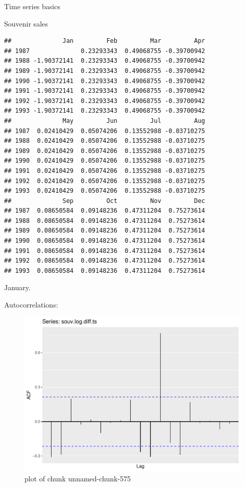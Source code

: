 \documentclass[ignorenonframetext,]{beamer}
\newenvironment{Shaded}{\begin{snugshade}}{\end{snugshade}}
\newcommand{\DataTypeTok}[1]{\textcolor[rgb]{0.13,0.29,0.53}{#1}}
\newcommand{\KeywordTok}[1]{\textcolor[rgb]{0.13,0.29,0.53}{\textbf{#1}}}
\newcommand{\NormalTok}[1]{#1}
\newcommand{\OperatorTok}[1]{\textcolor[rgb]{0.81,0.36,0.00}{\textbf{#1}}}
\newcommand{\StringTok}[1]{\textcolor[rgb]{0.31,0.60,0.02}{#1}}
\begin{document}
\begin{frame}[fragile]{Time series basics}
\begin{block}{Souvenir sales}
\begin{verbatim}
##              Jan         Feb         Mar         Apr
## 1987              0.23293343  0.49068755 -0.39700942
## 1988 -1.90372141  0.23293343  0.49068755 -0.39700942
## 1989 -1.90372141  0.23293343  0.49068755 -0.39700942
## 1990 -1.90372141  0.23293343  0.49068755 -0.39700942
## 1991 -1.90372141  0.23293343  0.49068755 -0.39700942
## 1992 -1.90372141  0.23293343  0.49068755 -0.39700942
## 1993 -1.90372141  0.23293343  0.49068755 -0.39700942
##              May         Jun         Jul         Aug
## 1987  0.02410429  0.05074206  0.13552988 -0.03710275
## 1988  0.02410429  0.05074206  0.13552988 -0.03710275
## 1989  0.02410429  0.05074206  0.13552988 -0.03710275
## 1990  0.02410429  0.05074206  0.13552988 -0.03710275
## 1991  0.02410429  0.05074206  0.13552988 -0.03710275
## 1992  0.02410429  0.05074206  0.13552988 -0.03710275
## 1993  0.02410429  0.05074206  0.13552988 -0.03710275
##              Sep         Oct         Nov         Dec
## 1987  0.08650584  0.09148236  0.47311204  0.75273614
## 1988  0.08650584  0.09148236  0.47311204  0.75273614
## 1989  0.08650584  0.09148236  0.47311204  0.75273614
## 1990  0.08650584  0.09148236  0.47311204  0.75273614
## 1991  0.08650584  0.09148236  0.47311204  0.75273614
## 1992  0.08650584  0.09148236  0.47311204  0.75273614
## 1993  0.08650584  0.09148236  0.47311204  0.75273614
\end{verbatim}

January.

Autocorrelations:

\begin{Shaded}
\end{Shaded}

\begin{figure}
\centering
\includegraphics{figure/unnamed-chunk-575-1.pdf}
\caption{plot of chunk unnamed-chunk-575}
\end{figure}


\end{block}
\end{frame}
\end{document}
